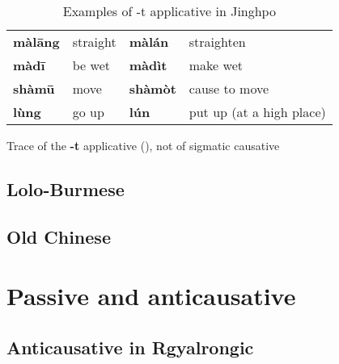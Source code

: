 \documentclass[oneside,a4paper,11pt]{article}
\newcommand{\ipa}[1]{\textbf{{\phon\mbox{#1}}}} %
\newcommand{\zh}[1]{{\cn #1}}
\newcommand{\forme}[2]{\ipa{#1} `#2'}
\begin{document}
 
 \begin{table}
\caption{Examples of -t applicative in Jinghpo} \label{tab:jinghpo.appl} \centering
\begin{tabular}{llll}
\toprule
\ipa{màlāng} &straight &\ipa{màlán} &straighten \\
\ipa{màdī} &be wet &\ipa{màdìt} &make wet \\
\ipa{shàmū} &move &\ipa{shàmòt} &cause to move \\
\ipa{lùng} &go up&\ipa{lún} &put up (at a high place) \\
\bottomrule
\end{tabular}
\end{table}
 

Trace of the \ipa{-t} applicative (\citealt{michailovsky85dental, jacques15derivational.khaling}), not of sigmatic causative
\subsection{Lolo-Burmese}
\subsection{Old Chinese}


\section{Passive and anticausative}

\subsection{Anticausative in Rgyalrongic}
%
%
%
% 
%
%
% 

% 
% 
% 
%
\end{document}
